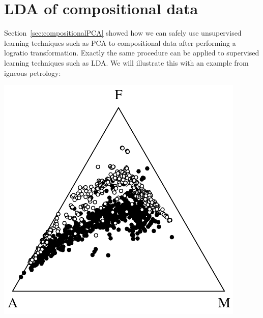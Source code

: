 \section{LDA of compositional data}
\label{sec:compositionalLDA}

Section~\ref{sec:compositionalPCA} showed how we can safely use
unsupervised learning techniques such as PCA to compositional data
after performing a logratio transformation. Exactly the same procedure
can be applied to supervised learning techniques such as LDA. We will
illustrate this with an example from igneous petrology:

\noindent\begin{minipage}[t][][b]{.35\textwidth}
\includegraphics[width=\textwidth]{../figures/AFM.pdf}\\
\end{minipage}
\begin{minipage}[t][][t]{.65\textwidth}
  \label{fig:AFM}
\end{minipage}

